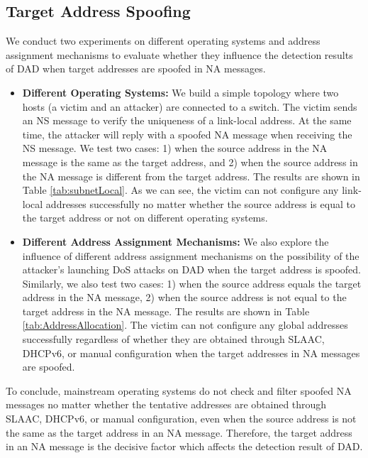 \documentclass[a4paper,fleqn]{cas-dc}
\begin{document}
    \subsection{Target Address Spoofing}
        We conduct two experiments on different operating systems and address assignment mechanisms to evaluate whether they influence the detection results of DAD when target addresses are spoofed in NA messages.

        \begin{itemize}
            \item \textbf{Different Operating Systems:}
            We build a simple topology where two hosts (a victim and an attacker) are connected to a switch. The victim sends an NS message to verify the uniqueness of a link-local address. At the same time, the attacker will reply with a spoofed NA message when receiving the NS message. We test two cases: 1) when the source address in the NA message is the same as the target address, and 2) when the source address in the NA message is different from the target address.
            The results are shown in Table \ref{tab:subnetLocal}. As we can see, the victim can not configure any link-local addresses successfully no matter whether the source address is equal to the target address or not on different operating systems. 

            \item \textbf{Different Address Assignment Mechanisms:}
            We also explore the influence of different address assignment mechanisms on the possibility of the attacker's launching DoS attacks on DAD when the target address is spoofed. Similarly, we also test two cases: 1) when the source address equals the target address in the NA message, 2) when the source address is not equal to the target address in the NA message.
            The results are shown in Table \ref{tab:AddressAllocation}. The victim can not configure any global addresses successfully regardless of whether they are obtained through SLAAC, DHCPv6, or manual configuration when the target addresses in NA messages are spoofed.
        \end{itemize}

        To conclude, mainstream operating systems do not check and filter spoofed NA messages no matter whether the tentative addresses are obtained through SLAAC, DHCPv6, or manual configuration, even when the source address is not the same as the target address in an NA message. Therefore, the target address in an NA message is the decisive factor which affects the detection result of DAD.
\end{document}
